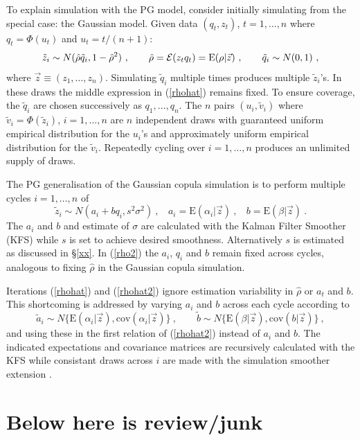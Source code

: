 \documentclass[authoryear]{elsarticle}
\newcommand{\E}{\mathrm{E}}
\newcommand{\cov}{\mathrm{cov}}
\newcommand{\Ex}{{\cal E}}
\newcommand{\eref}[1]{(\ref{#1})}
\newcommand{\sref}[1]{\S\ref{#1}}
\newcommand{\cq}{\ , \qquad}
\newcommand{\be}[1]{\begin{equation}\label{#1}}
\newcommand{\ee}{\end{equation}}
\begin{document}
To explain simulation with the PG model, consider initially  simulating from the special case: the Gaussian model.   Given data $(q_t,z_t)$, $t=1,\ldots,n$ where
$q_t=\Phi(u_t)$ and $u_t=t/(n+1)$: 
\be{rhohat}
\tilde z_i\sim N(\hat\rho \tilde q_i,1-\hat\rho^2)\cq \hat\rho=\Ex(z_tq_t) = \E(\rho|\vec z)\cq \tilde q_i\sim N(0,1)\ ,
\ee
where $\vec z\equiv(z_1,\ldots,z_n)$.
Simulating $\tilde q_i$ multiple times produces multiple $\tilde z_i$'s.   In these draws the middle expression in \eref{rhohat} remains fixed.   To ensure  coverage, the $\tilde q_i$ are chosen successively as $q_1,\ldots,q_n$.   The  $n$ pairs $(u_i, \tilde v_i)$ where $\tilde v_i=\Phi(\tilde z_i)$, $i=1,\ldots,n$  are $n$ independent draws with guaranteed  uniform  empirical distribution for the $u_i$'s and approximately uniform empirical distribution for the $\tilde v_i$.   Repeatedly cycling over $i=1,\ldots,n$  produces an unlimited supply of  draws.

The PG generalisation of the Gaussian copula simulation  is to perform multiple cycles  $i=1,\ldots,n$ of 
\be{rhohat2}
\tilde z_i\sim N(a_i+bq_i, s^2\sigma^2)\ , \ \ \ \  a_i=\E(\alpha_i|\vec z)\ , \ \ \ \ b=\E(\beta|\vec z)\ .
\ee
The $a_i$ and $b$ and estimate of $\sigma$ are calculated with the Kalman Filter Smoother (KFS)  \citep{DeJong:91a} while $s$ is set to achieve desired smoothness.  Alternatively $s$ is estimated as discussed in \sref{xx}.  In  \eref{rho2} the $a_i$, $q_i$  and $b$ remain fixed across cycles, analogous to fixing $\hat \rho$  in the  Gaussian copula simulation.   

Iterations \eref{rhohat} and \eref{rhohat2}  ignore  estimation variability in $\hat\rho$ or $a_t$ and $b$.  This shortcoming is addressed by varying  $a_i$ and $b$  across  each cycle according to 
$$
\tilde a_i \sim N\{\E(\alpha_i|\vec z),\cov(\alpha_i|\vec z)\}\cq  \tilde b\sim N\{\E(\beta|\vec z),\cov(b|\vec z)\}\ ,
$$
and using these  in the first relation of \eref{rhohat2}  instead of $a_i$ and $b$.
The indicated expectations and covariance matrices are recursively calculated with the KFS while consistant  draws  across $i$  are made with the 
simulation smoother extension  \citep{DeJong&Shephard:95}.  
 

\section{Below here is review/junk}
\end{document}
